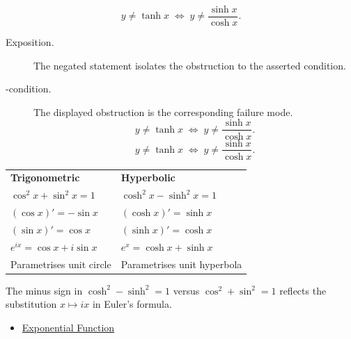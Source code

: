 \begin{remark*}
\[
y\neq\tanh x
  \;\iff\;
  y \neq \frac{\sinh x}{\cosh x}.
\]
\end{remark*}

\begin{remark*}
\begin{description}
  \item[Exposition.]
  The negated statement isolates the obstruction to the asserted condition.

  \item[\neq-condition.]
  The displayed obstruction is the corresponding failure mode.
  \[
y\neq\tanh x
  \;\iff\;
  y \neq \frac{\sinh x}{\cosh x}.
  \]
  \[
y\neq\tanh x
  \;\iff\;
  y \neq \frac{\sinh x}{\cosh x}.
  \]
\end{description}
\end{remark*}



\begin{remark*}[Interpretation]
\begin{center}
\begin{tabular}{@{}ll@{}}
\textbf{Trigonometric} & \textbf{Hyperbolic} \\
$\cos^2 x + \sin^2 x = 1$ & $\cosh^2 x - \sinh^2 x = 1$ \\
$(\cos x)' = -\sin x$ & $(\cosh x)' = \sinh x$ \\
$(\sin x)' = \cos x$ & $(\sinh x)' = \cosh x$ \\
$e^{ix} = \cos x + i\sin x$ & $e^x = \cosh x + \sinh x$ \\
Parametrises unit circle & Parametrises unit hyperbola \\
\end{tabular}
\end{center}
The minus sign in $\cosh^2 - \sinh^2 = 1$ versus $\cos^2 + \sin^2 =
1$ reflects the substitution $x \mapsto ix$ in Euler's formula.
\end{remark*}

\begin{dependencies}
\begin{itemize}
  \item \hyperref[def:exponential]{Exponential Function}
\end{itemize}
\end{dependencies}


